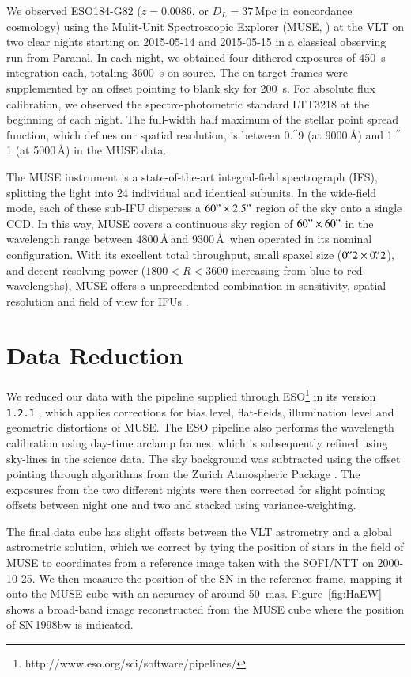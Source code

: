 \documentclass[traditabstract]{aa}
\newcommand{\farc}{\hbox{$.\!\!^{\prime\prime}$}}
\begin{document}
We observed ESO184-G82 ($z=0.0086$, or $D_L=37$\,Mpc in concordance cosmology) using the Mulit-Unit Spectroscopic Explorer (MUSE, \citealp{2010SPIE.7735E..08B}) at the VLT on two clear nights starting on 2015-05-14 and 2015-05-15 in a classical observing run from Paranal. In each night, we obtained four dithered exposures of 450~s integration each, totaling 3600~s on source. The on-target frames were supplemented by an offset pointing to blank sky for 200~s. For absolute flux calibration, we observed the spectro-photometric standard LTT3218 at the beginning of each night. The full-width half maximum of the stellar point spread function, which defines our spatial resolution, is between 0\farc{9} (at 9000\,\AA) and 1\farc{1} (at 5000\,\AA) in the MUSE data.

The MUSE instrument is a state-of-the-art integral-field spectrograph (IFS), splitting the light into 24 individual and identical subunits. In the wide-field mode, each of these sub-IFU disperses a $60"\times 2.5"$ region of the sky onto a single CCD. In this way, MUSE covers a continuous sky region of $60"\times 60"$ in the wavelength range between 4800\,\AA\,and 9300\,\AA\, when operated in its nominal configuration. With its excellent total throughput, small spaxel size ($0\farc{2} \times 0\farc{2}$), and decent resolving power ($1800 < R < 3600$ increasing from blue to red wavelengths), MUSE offers a unprecedented combination in sensitivity, spatial resolution and field of view for IFUs \citep{2010SPIE.7735E..08B}.

\section{Data Reduction}

We reduced our data with the pipeline supplied through ESO\footnote{http://www.eso.org/sci/software/pipelines/} in its version \texttt{1.2.1} \citep{2014ASPC..485..451W}, which applies corrections for bias level, flat-fields, illumination level and geometric distortions of MUSE. The ESO pipeline also performs the wavelength calibration using day-time arclamp frames, which is subsequently refined using sky-lines in the science data. The sky background was subtracted using the offset pointing through algorithms from the Zurich Atmospheric Package \citep{2016MNRAS.458.3210S}. The exposures from the two different nights were then corrected for slight pointing offsets between night one and two and stacked using variance-weighting.

The final data cube has slight offsets between the VLT astrometry and a global astrometric solution, which we correct by tying the position of stars in the field of MUSE to coordinates from a reference image taken with the SOFI/NTT on 2000-10-25. We then measure the position of the SN in the reference frame, mapping it onto the MUSE cube with an accuracy of around 50~mas. Figure~\ref{fig:HaEW} shows a broad-band image reconstructed from the MUSE cube where the position of SN\,1998bw is indicated.
\end{document}
